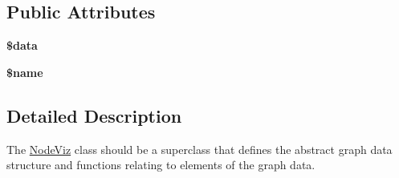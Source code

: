 \subsection*{Public Attributes}
\begin{DoxyCompactItemize}
\item 
\hypertarget{classNodeViz_a27ee51093b4eace279fb132ee21feb11}{
{\bfseries \$data}}
\label{classNodeViz_a27ee51093b4eace279fb132ee21feb11}

\item 
\hypertarget{classNodeViz_a8a6d6801b06ee43f2a263984f68395ac}{
{\bfseries \$name}}
\label{classNodeViz_a8a6d6801b06ee43f2a263984f68395ac}

\end{DoxyCompactItemize}


\subsection{Detailed Description}
The \hyperlink{classNodeViz}{NodeViz} class should be a superclass that defines the abstract graph data structure and functions relating to elements of the graph data. 

